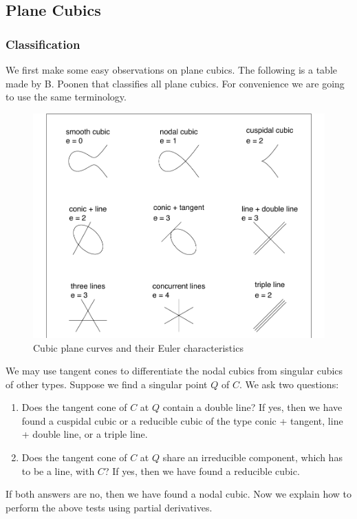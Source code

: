 \documentclass[12pt]{article}
\theoremstyle{plain}
\theoremstyle{definition}
\newcommand{\<}{\langle}
\renewcommand{\>}{\rangle}
\begin{document}
\subsection{Plane Cubics}
\subsubsection{Classification}
\label{classification}
We first make some easy observations on plane cubics. The following is a table made by B. Poonen that classifies all plane cubics. For convenience we are going to use the same terminology.

\begin{figure}[h!]
  \label{figure}
  \centering
      \includegraphics[width=1.0\textwidth]{planecubics}
  \caption{Cubic plane curves and their Euler characteristics \cite{Pic}}
\end{figure}

We may use tangent cones to differentiate the nodal cubics from singular cubics of other types. Suppose we find a singular point $Q$ of $C$. We ask two questions:
\begin{enumerate}
\item Does the tangent cone of $C$ at $Q$ contain a double line? If yes, then we have found a cuspidal cubic or a reducible cubic of the type conic + tangent, line + double line, or a triple line. 
\item Does the tangent cone of $C$ at $Q$ share an irreducible component, which has to be a line, with $C$? If yes, then we have found a reducible cubic. 
\end{enumerate}
If both answers are no, then we have found a nodal cubic. Now we explain how to perform the above tests using partial derivatives. 
\end{document}
